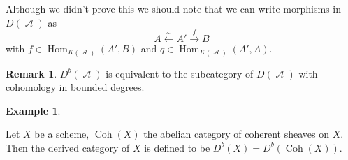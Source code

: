\documentclass[10pt,]{book}
\theoremstyle{plain}
\theoremstyle{definition}
\newtheorem{example}[theorem]{Example}
\newtheorem{remark}[theorem]{Remark}
\numberwithin{equation}{section}
\DeclareMathOperator{\Coh}{Coh}
\DeclareMathOperator{\Hom}{Hom}
\DeclareMathOperator{\cA}{\mathcal{A}}
\begin{document}
          Although we didn't prove this we should note that we can write morphisms in \(D(\cA)\) as 
          \[
            A \xleftarrow{\sim} A' \xrightarrow{f} B
          \]
          with \(f\in \Hom_{K(\cA)}(A', B)\) and \(q\in \Hom_{K(\cA)}(A', A)\).
\begin{remark}\label{remark-2}
\(D^b(\cA)\) is equivalent to the subcategory of \(D(\cA)\) with cohomology in bounded degrees.
          \end{remark}
\begin{example}\label{example-13}

            Let \(X\) be a scheme, \(\Coh(X)\) the abelian category of coherent sheaves on \(X\).
            Then the derived category of \(X\) is defined to be \(D^b(X) = D^b(\Coh(X))\).
          \end{example}
\par
\end{document}
